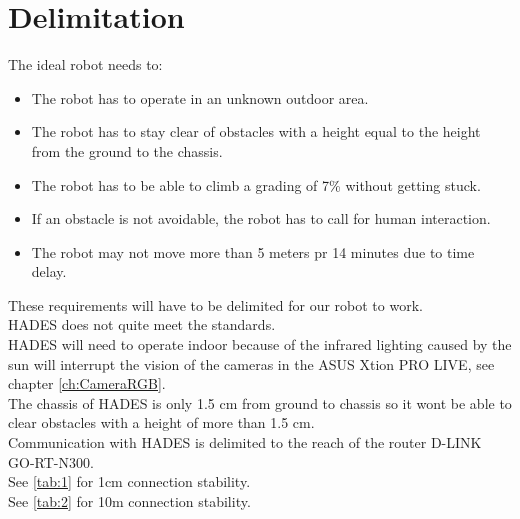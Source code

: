 \chapter{Delimitation} \label{ch:Delimitation}

The ideal robot needs to:

\begin{itemize}
    \item The robot has to operate in an unknown outdoor area.
    \item The robot has to stay clear of obstacles with a height equal to the height from the ground to the chassis. 
    \item The robot has to be able to climb a grading of 7\% without getting stuck.
    \item If an obstacle is not avoidable, the robot has to call for human interaction.
    \item The robot may not move more than 5 meters pr 14 minutes due to time delay.
\end{itemize}

These requirements will have to be delimited for our robot to work.\\
HADES does not quite meet the standards.\\
HADES will need to operate indoor because of the infrared lighting caused by the sun will interrupt the vision of the cameras in the ASUS Xtion PRO LIVE, see chapter \ref{ch:CameraRGB}.\\
The chassis of HADES is only 1.5 cm from ground to chassis so it wont be able to clear obstacles with a height of more than 1.5 cm.\\
Communication with HADES is delimited to the reach of the router D-LINK GO-RT-N300.\\
See \ref{tab:1} for 1cm connection stability.\\
See \ref{tab:2} for 10m connection stability.\\



